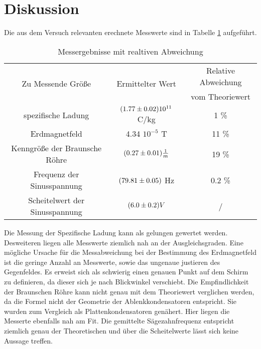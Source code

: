 \section{Diskussion}
\label{sec:Diskussion}
Die aus dem Versuch relevanten erechnete Messwerte sind in Tabelle \ref{tab:sum} aufgeführt.
\begin{table}[H]
  \centering
  \begin{tabular}{c|c c}
    \toprule
	\multirow{2}{*}{Zu Messende Größe} & \multirow{2}{*}{Ermittelter Wert} & Relative Abweichung \\
	& & vom Theoriewert \\
    \midrule
    spezifische Ladung & $(\num{1.77 +- 0.02})10^{11}$ C/kg & 1 \% \cite{e0m0} 	\\
    Erdmagnetfeld 	  &  4.34 \cdot $10^{-5}$ T       & 11 \% \cite{spez}  	\\
     Kenngröße der Braunsche Röhre& $(\num{0.27 +- 0.01}) \frac{1}{m}$ & 19 \% \\
     Frequenz der Sinusspannung& $(\num{79.81 +- 0.05})$ Hz & 0.2 \% \\
     Scheitelwert der Sinusspannung& $ (\num{6.0 +- 0.2}) V $& / \\
    \bottomrule
  \end{tabular}
  \caption{Messergebnisse mit realtiven Abweichung}
  \label{tab:sum}
\end{table}
Die Messung der Spezifische Ladung kann als gelungen gewertet werden. Desweiteren liegen alle Messwerte ziemlich nah an der Ausgleichsgraden. Eine mögliche Ursache für die Messabweichung bei der Bestimmung des Erdmagnetfeld ist die geringe Anzahl an Messwerte, sowie das ungenaue justieren des Gegenfeldes. Es erweist sich als schwierig einen genauen Punkt auf dem Schirm zu definieren, da dieser sich je nach Blickwinkel verschiebt. Die Empfindlichkeit der Braunschen Röhre kann nicht genau mit dem Theoriewert verglichen werden, da die Formel nicht der Geometrie der Ablenkkondensatoren entspricht. Sie wurden zum Vergleich als Plattenkondensatoren genähert. Hier liegen die Messerte ebenfalls nah am Fit. Die gemittelte Sägezahnfrequenz entspricht ziemlich genau der Theoretischen und über die Scheitelwerte lässt sich keine Aussage treffen. 

